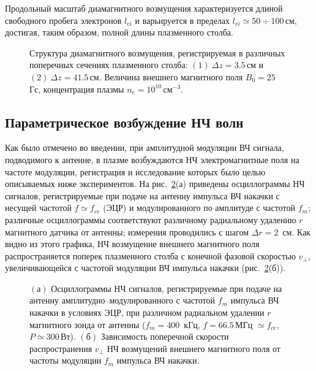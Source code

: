 \documentclass[autoref,10pt]{disser}
\begin{document}
Продольный масштаб диамагнитного возмущения характеризуется длиной свободного пробега электронов $l_{ei}$ и варьируется в пределах $l_{ei}\simeq{}50\div{}100$\,см, достигая, таким образом, полной длины плазменного столба. 

\begin{figure}[H]
    \centering
    \def\svgwidth{0.75\columnwidth} %
    
    \caption{Структура диамагнитного возмущения, регистрируемая в различных поперечных сечениях плазменного столба: $(1)\ {}\Delta{}z=3.5$\,см и $(2)\ {}\Delta{}z=41.5$\,см. Величина внешнего магнитного поля $B_{0}=25$\, Гс, концентрация плазмы $n_{e}=10^{10}$\,см$^{-3}$.}
    \label{fig:pic1HARM_L3+L1RAD}
\end{figure}
\subsection{Параметрическое возбуждение НЧ волн}
Как было отмечено во введении, при амплитудной модуляции ВЧ сигнала, подводимого к антенне, в плазме возбуждаются НЧ электромагнитные поля на частоте модуляции, регистрация и исследование которых было целью описываемых ниже экспериментов.
На \mbox{рис.~\ref{fig:phase_composite}(а)} приведены  осциллограммы НЧ сигналов, регистрируемые при подаче на антенну импульса ВЧ накачки с несущей частотой $f\simeq{}f_{ce}$ (ЭЦР) и модулированного по амплитуде с частотой $f_{m}$; различные осциллограммы соответствуют различному радиальному удалению $r$ магнитного датчика от антенны; измерения проводились с шагом $\Delta{}r = 2$~см. Как видно из этого графика, НЧ возмущение внешнего магнитного поля распространяется поперек плазменного столба с конечной фазовой скоростью $v_{\perp}$, увеличивающейся с частотой модуляции ВЧ импульса накачки (\mbox{рис.~\ref{fig:phase_composite}(б)}).
\begin{figure}[H]
  \centering
  \def\svgwidth{0.6\columnwidth} %
  
  \caption{$(а)$ Осциллограммы НЧ сигналов, регистрируемые при подаче на антенну амплитудно--модулированного с частотой $f_{m}$ импульса ВЧ накачки в условиях ЭЦР, при различном радиальном удалении $r$ магнитного зонда от антенны ($f_{m} = 400$\, кГц, $f=66.5$\,МГц $\simeq f_{ce}$, $P\simeq 300$\,Вт). $(б)$ Зависимость поперечной скорости распространения $v_{\perp}$ НЧ возмущений внешнего магнитного поля от частоты модуляции $f_{m}$ импульса ВЧ накачки.}
  \label{fig:phase_composite}
\end{figure} 
\end{document}
